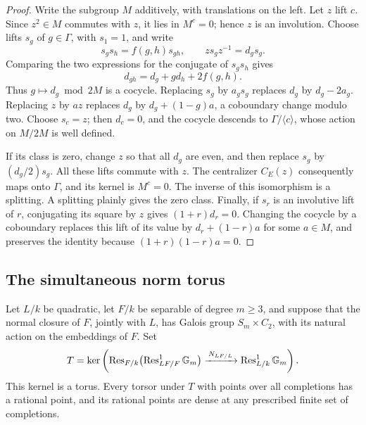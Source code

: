 \begin{proof}
Write the subgroup \(M\) additively, with translations on the left.
Let \(z\) lift \(c\).  Since \(z^2\in M\) commutes with \(z\),
it lies in \(M^c=0\); hence \(z\) is an involution.
Choose lifts \(s_g\) of \(g\in\Gamma\), with \(s_1=1\), and write
\[
 s_gs_h=f(g,h)s_{gh},\qquad
                 z s_gz^{-1}=d_gs_g.
\]
Comparing the two expressions for the conjugate of \(s_gs_h\) gives
\[
                    d_{gh}=d_g+g d_h+2f(g,h).
\]
Thus \(g\mapsto d_g\bmod 2M\) is a cocycle.
Replacing \(s_g\) by \(a_gs_g\) replaces \(d_g\) by
\(d_g-2a_g\).  Replacing \(z\) by \(az\) replaces \(d_g\) by
\(d_g+(1-g)a\), a coboundary change modulo two.
Choose \(s_c=z\); then \(d_c=0\), and the cocycle descends to
\(\Gamma/\langle c\rangle\), whose action on \(M/2M\) is well
defined.

If its class is zero, change \(z\) so that all \(d_g\) are even,
and then replace \(s_g\) by \((d_g/2)s_g\).  All these lifts commute
with \(z\).  The centralizer \(C_E(z)\) consequently maps onto
\(\Gamma\), and its kernel is \(M^c=0\).  The inverse of this
isomorphism is a splitting.  A splitting plainly gives the zero
class.  Finally, if \(s_r\) is an involutive lift of \(r\), conjugating
its square by \(z\) gives \((1+r)d_r=0\).
Changing the cocycle by a coboundary replaces this lift of its value
by \(d_r+(1-r)a\) for some \(a\in M\), and preserves the identity
because \((1+r)(1-r)a=0\).
\end{proof}

\subsection{The simultaneous norm torus}

\begin{lemma}
\label{lem:norm-torus}
Let \(L/k\) be quadratic, let \(F/k\) be separable of degree
\(m\geq3\), and suppose that the normal closure of \(F\), jointly
with \(L\), has Galois group \(S_m\times C_2\), with its natural
action on the embeddings of \(F\).  Set
\[
 T=\ker\left(
 \operatorname{Res}_{F/k}\bigl(\operatorname{Res}^1_{LF/F}\mathbb G_m\bigr)
       \xrightarrow{\,N_{LF/L}\,}\operatorname{Res}^1_{L/k}\mathbb G_m
 \right).
\]
This kernel is a torus.  Every torsor under \(T\) with points
over all completions has a rational point, and its rational points
are dense at any prescribed finite set of completions.
\end{lemma}

